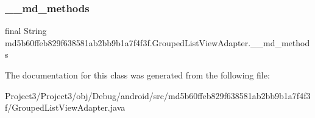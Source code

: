 \subsubsection{\texorpdfstring{\+\_\+\+\_\+md\+\_\+methods}{\_\_md\_methods}}
{\footnotesize\ttfamily final String md5b60ffeb829f638581ab2bb9b1a7f4f3f.\+Grouped\+List\+View\+Adapter.\+\_\+\+\_\+md\+\_\+methods\hspace{0.3cm}{\ttfamily [static]}}



The documentation for this class was generated from the following file\+:\begin{DoxyCompactItemize}
\item 
Project3/\+Project3/obj/\+Debug/android/src/md5b60ffeb829f638581ab2bb9b1a7f4f3f/Grouped\+List\+View\+Adapter.\+java\end{DoxyCompactItemize}
